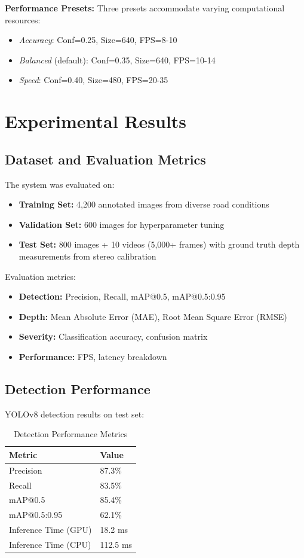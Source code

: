 \documentclass[conference]{IEEEtran}
\begin{document}
\textbf{Performance Presets:}
Three presets accommodate varying computational resources:
\begin{itemize}
    \item \textit{Accuracy}: Conf=0.25, Size=640, FPS=8-10
    \item \textit{Balanced} (default): Conf=0.35, Size=640, FPS=10-14
    \item \textit{Speed}: Conf=0.40, Size=480, FPS=20-35
\end{itemize}

\section{Experimental Results}

\subsection{Dataset and Evaluation Metrics}

The system was evaluated on:
\begin{itemize}
    \item \textbf{Training Set:} 4,200 annotated images from diverse road conditions
    \item \textbf{Validation Set:} 600 images for hyperparameter tuning
    \item \textbf{Test Set:} 800 images + 10 videos (5,000+ frames) with ground truth depth measurements from stereo calibration
\end{itemize}

Evaluation metrics:
\begin{itemize}
    \item \textbf{Detection:} Precision, Recall, mAP@0.5, mAP@0.5:0.95
    \item \textbf{Depth:} Mean Absolute Error (MAE), Root Mean Square Error (RMSE)
    \item \textbf{Severity:} Classification accuracy, confusion matrix
    \item \textbf{Performance:} FPS, latency breakdown
\end{itemize}

\subsection{Detection Performance}

YOLOv8 detection results on test set:

\begin{table}[h]
\centering
\caption{Detection Performance Metrics}
\begin{tabular}{@{}ll@{}}
\toprule
\textbf{Metric} & \textbf{Value} \\ \midrule
Precision & 87.3\% \\
Recall & 83.5\% \\
mAP@0.5 & 85.4\% \\
mAP@0.5:0.95 & 62.1\% \\
Inference Time (GPU) & 18.2 ms \\
Inference Time (CPU) & 112.5 ms \\ \bottomrule
\end{tabular}
\end{table}
\end{document}
